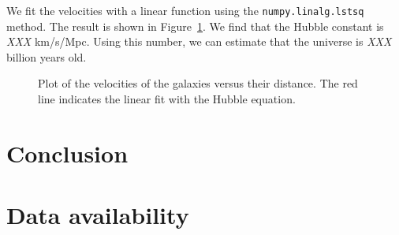 \documentclass[10pt,twocolumn]{article}
\begin{document}
We fit the velocities with a linear function using the \verb+numpy.linalg.lstsq+
method. The result is shown in Figure~\ref{fig:hubblefit}. We find that the 
Hubble constant is \textit{XXX} km/s/Mpc. Using this number, we can estimate that the 
universe is \textit{XXX} billion years old.

\begin{figure}

\caption{Plot of the velocities of the galaxies versus their distance. The
red line indicates the linear fit with the Hubble equation.}
\label{fig:hubblefit}
\end{figure}


\section{Conclusion}



\section{Data availability}



 
\end{document}
